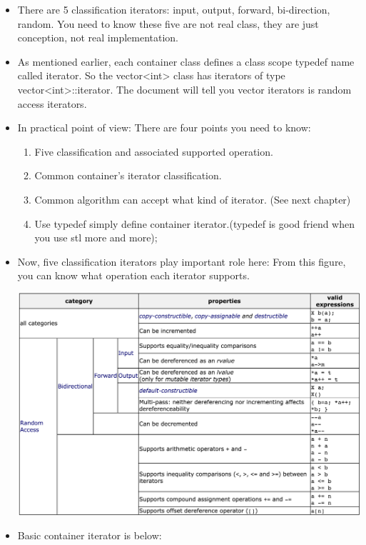 \documentclass[a4paper,12pt,twoside]{book}
\begin{document}
\begin{itemize}
\item There are 5 classification iterators: input, output, forward, bi-direction, random. You need to know these five are not real class, they are just conception, not real implementation.

\item As mentioned earlier, each container class defines a class scope typedef name called iterator. So the vector<int> class has iterators of type vector<int>::iterator.  The document will tell you vector iterators is  random access iterators.

 \item In practical point of view: There are four points you need to know:
\begin{enumerate}
\item Five classification and associated supported operation.
\item Common container's iterator classification.
\item Common algorithm can accept what kind of iterator. (See next chapter)
\item Use typedef simply define container iterator.(typedef is good friend when you use stl more and more);
\end{enumerate}

\item Now, five classification iterators play important role here: From this figure, you can know what operation each iterator supports.  \newline

  \includegraphics[scale=0.48]{pics/iterator.png}

\item Basic container iterator is below: \newline


\end{itemize}
\end{document}

